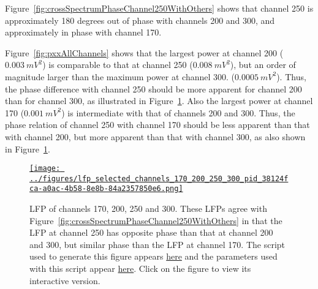 \documentclass[12pt]{article}
\begin{document}
Figure~\ref{fig:crossSpectrumPhaseChannel250WithOthers} shows that channel 250
is approximately 180 degrees out of phase with channels 200 and 300, and
approximately in phase with channel 170.

Figure~\ref{fig:pxxAllChannels} shows that the largest power at channel 200
($0.003~mV^2$) is comparable to that at channel 250 ($0.008~mV^2$), but an
order of magnitude larger than the maximum power at channel 300.
($0.0005~mV^2$). Thus, the phase difference with channel 250 should be more
apparent for channel 200 than for channel 300, as illustrated in
Figure~\ref{fig:lfpSelectedChannels2}.
%
Also the largest power at channel 170 ($0.001~mV^2$) is intermediate with that
of channels 200 and 300. Thus, the phase relation of channel 250 with channel 170
should be less apparent than that with channel 200, but more apparent than that
with channel 300, as also shown in Figure~\ref{fig:lfpSelectedChannels2}.

\begin{figure}[H]
    \begin{center}
        \href{https://www.gatsby.ucl.ac.uk/~rapela/neuroinformatics/2023/ws3/figures/lfp_selected_channels_170_200_250_300_pid_38124fca-a0ac-4b58-8e8b-84a2357850e6.html}{\texttt{[image: ../figures/lfp\_selected\_channels\_170\_200\_250\_300\_pid\_38124fca-a0ac-4b58-8e8b-84a2357850e6.png]}}

        \caption{LFP of channels 170, 200, 250 and 300. These LFPs agree with
        Figure~\ref{fig:crossSpectrumPhaseChannel250WithOthers} in that the LFP
        at channel 250 has opposite phase than that at channel 200 and 300, but
        similar phase than the LFP at channel 170.  The script used to generate
        this figure appears
        \href{https://github.com/joacorapela/neuroinformatics23/blob/master/worksheets/ws3/mySolution/code/scripts/doPlotSomeChannelsLFPs.py}{here}
        and the parameters used with this script appear
        \href{https://github.com/joacorapela/neuroinformatics23/blob/master/worksheets/ws3/mySolution/code/scripts/doPlotSomeChannelsLFPs.csh}{here}.
        Click on the figure to view its interactive version.}

        \label{fig:lfpSelectedChannels2}

        \end{center}
\end{figure}
\end{document}
